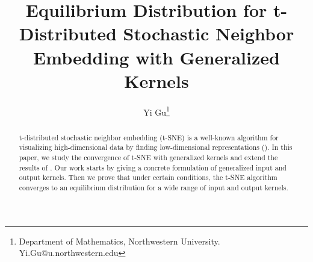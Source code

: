 \documentclass[10pt]{article}
\author{Yi Gu\footnote{Department of Mathematics, Northwestern University. Yi.Gu@u.northwestern.edu}}
\begin{document}
\title{Equilibrium Distribution for t-Distributed Stochastic Neighbor Embedding with Generalized Kernels}
\maketitle

\begin{abstract}
    t-distributed stochastic neighbor embedding (t-SNE) is a well-known algorithm for visualizing high-dimensional data by finding low-dimensional representations (\cite{key}). In this paper, we study the convergence of t-SNE with generalized kernels and extend the results of \cite{auffinger-tsne}. Our work starts by giving a concrete formulation of generalized input and output kernels. Then we prove that under certain conditions, the t-SNE algorithm converges to an equilibrium distribution for a wide range of input and output kernels.
\end{abstract}
\tableofcontents


\nocite{*}

\end{document}
